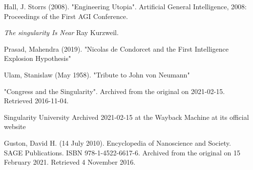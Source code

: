 \documentclass[a4paper]{article}
\begin{document}
\begin{thebibliography}{9}
 Hall, J. Storrs (2008). "Engineering Utopia". Artificial General Intelligence, 2008: Proceedings of the First AGI Conference.

 \textit{The singularity Is Near} Ray Kurzweil.

Prasad, Mahendra (2019). "Nicolas de Condorcet and the First Intelligence Explosion Hypothesis"

 Ulam, Stanislaw (May 1958). "Tribute to John von Neumann"

  "Congress and the Singularity". Archived from the original on 2021-02-15. Retrieved 2016-11-04.

 Singularity University Archived 2021-02-15 at the Wayback Machine at its official website

 Guston, David H. (14 July 2010). Encyclopedia of Nanoscience and Society. SAGE Publications. ISBN 978-1-4522-6617-6. Archived from the original on 15 February 2021. Retrieved 4 November 2016.

\end{thebibliography}
\end{document}
